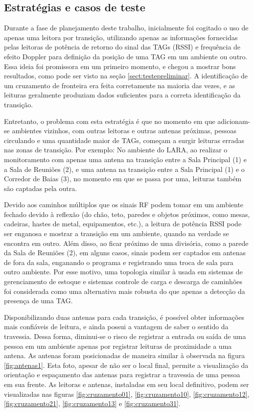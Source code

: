  \subsection{Estratégias e casos de teste} \label{section:estrategias}

 Durante a fase de planejamento deste trabalho, inicialmente foi cogitado o uso de apenas uma leitora por transição, utilizando apenas as informações fornecidas pelas leitoras de potência de retorno do sinal das TAGs (RSSI) e frequência de efeito Doppler para definição da posição de uma TAG em um ambiente ou outro. Essa ideia foi promissora em um primeiro momento, e chegou a mostrar bons resultados, como pode ser visto na seção \ref{sect:testepreliminar}. A identificação de um cruzamento de fronteira era feita corretamente na maioria das vezes, e as leituras geralmente produziam dados suficientes para a correta identificação da transição.
 
 Entretanto, o problema com esta estratégia é que no momento em que adicionam-se ambientes vizinhos, com outras leitoras e outras antenas próximas, pessoas circulando e uma quantidade maior de TAGs, começam a surgir leituras erradas nas zonas de transição. Por exemplo: No ambiente do LARA, ao realizar o monitoramento com apenas uma antena na transição entre a Sala Principal (1) e a Sala de Reuniões (2), e uma antena na transição entre a Sala Principal (1) e o Corredor de Baias (3), no momento em que se passa por uma, leituras também são captadas pela outra. 
 
 Devido aos caminhos múltiplos que os sinais RF podem tomar em um ambiente fechado devido à reflexão (do chão, teto, paredes e objetos próximos, como mesas, cadeiras, hastes de metal, equipamentos, etc.), a leitura de potência RSSI pode ser enganosa e mostrar a transição em um ambiente, quando na verdade se encontra em outro. Além disso, ao ficar próximo de uma divisória, como a parede da Sala de Reuniões (2), em alguns casos, sinais podem ser captados em antenas de fora da sala, enganando o programa e registrando uma troca de sala para outro ambiente. Por esse motivo, uma topologia similar à usada em sistemas de gerenciamento de estoque e sistemas  controle de carga e descarga de caminhões \cite{PortalRFID} foi considerada como uma alternativa mais robusta do que apenas a detecção da presença de uma TAG.
 
 Disponibilizando duas antenas para cada transição, é possível obter informações mais confiáveis de leitura, e ainda possui a vantagem de saber o sentido da travessia. Dessa forma, diminui-se o risco de registrar a entrada ou saída de uma pessoa em um ambiente apenas por registrar leituras de proximidade a uma antena. As antenas foram posicionadas de maneira similar à observada na figura \ref{fig:antenas1}. Esta foto, apesar de não ser o local final, permite a visualização da orientação e espaçamento das antenas para registrar a travessia de uma pessoa em sua frente. As leitoras e antenas, instaladas em seu local definitivo, podem ser visualizadas nas figuras \ref{fig:cruzamento01}, \ref{fig:cruzamento10}, \ref{fig:cruzamento12}, \ref{fig:cruzamento21}, \ref{fig:cruzamento13} e \ref{fig:cruzamento31}.
 
